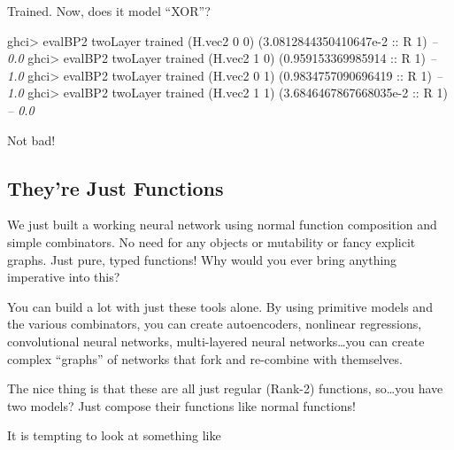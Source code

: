 \documentclass[]{article}
\newenvironment{Shaded}{}{}
\newcommand{\CommentTok}[1]{\textcolor[rgb]{0.38,0.63,0.69}{\textit{#1}}}
\newcommand{\DataTypeTok}[1]{\textcolor[rgb]{0.56,0.13,0.00}{#1}}
\newcommand{\DecValTok}[1]{\textcolor[rgb]{0.25,0.63,0.44}{#1}}
\newcommand{\FloatTok}[1]{\textcolor[rgb]{0.25,0.63,0.44}{#1}}
\newcommand{\FunctionTok}[1]{\textcolor[rgb]{0.02,0.16,0.49}{#1}}
\newcommand{\NormalTok}[1]{#1}
\newcommand{\OtherTok}[1]{\textcolor[rgb]{0.00,0.44,0.13}{#1}}
\begin{document}
Trained. Now, does it model ``XOR''?

\begin{Shaded}
\begin{Highlighting}[]
\NormalTok{ghci}\FunctionTok{>}\NormalTok{ evalBP2 twoLayer trained (H.vec2 }\DecValTok{0} \DecValTok{0}\NormalTok{)}
\NormalTok{(}\FloatTok{3.0812844350410647e-2}\OtherTok{ ::} \DataTypeTok{R} \DecValTok{1}\NormalTok{)          }\CommentTok{-- 0.0}
\NormalTok{ghci}\FunctionTok{>}\NormalTok{ evalBP2 twoLayer trained (H.vec2 }\DecValTok{1} \DecValTok{0}\NormalTok{)}
\NormalTok{(}\FloatTok{0.959153369985914}\OtherTok{ ::} \DataTypeTok{R} \DecValTok{1}\NormalTok{)              }\CommentTok{-- 1.0}
\NormalTok{ghci}\FunctionTok{>}\NormalTok{ evalBP2 twoLayer trained (H.vec2 }\DecValTok{0} \DecValTok{1}\NormalTok{)}
\NormalTok{(}\FloatTok{0.9834757090696419}\OtherTok{ ::} \DataTypeTok{R} \DecValTok{1}\NormalTok{)             }\CommentTok{-- 1.0}
\NormalTok{ghci}\FunctionTok{>}\NormalTok{ evalBP2 twoLayer trained (H.vec2 }\DecValTok{1} \DecValTok{1}\NormalTok{)}
\NormalTok{(}\FloatTok{3.6846467867668035e-2}\OtherTok{ ::} \DataTypeTok{R} \DecValTok{1}\NormalTok{)          }\CommentTok{-- 0.0}
\end{Highlighting}
\end{Shaded}

Not bad!

\hypertarget{theyre-just-functions}{%
\subsection{They're Just Functions}\label{theyre-just-functions}}

We just built a working neural network using normal function composition and
simple combinators. No need for any objects or mutability or fancy explicit
graphs. Just pure, typed functions! Why would you ever bring anything imperative
into this?

You can build a lot with just these tools alone. By using primitive models and
the various combinators, you can create autoencoders, nonlinear regressions,
convolutional neural networks, multi-layered neural networks\ldots{}you can
create complex ``graphs'' of networks that fork and re-combine with themselves.

The nice thing is that these are all just regular (Rank-2) functions,
so\ldots{}you have two models? Just compose their functions like normal
functions!

It is tempting to look at something like
\end{document}
